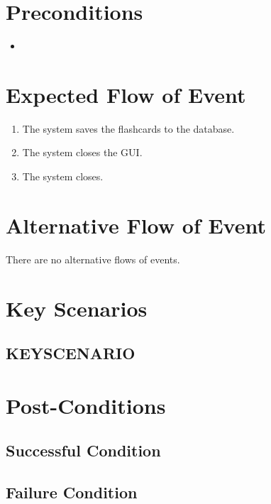 \documentclass{scrreprt}
\begin{document}
\section{Preconditions}
\begin{itemize}
    \item 
\end{itemize}

\section{Expected Flow of Event}
    \begin{enumerate}[1.]
        \item The system saves the flashcards to the database.
        \item The system closes the GUI.
        \item The system closes.
    \end{enumerate}

\section{Alternative Flow of Event}
    There are no alternative flows of events.

\section{Key Scenarios}
    \subsection{KEYSCENARIO}

\section{Post-Conditions}
    \subsection{Successful Condition}
    
    \subsection{Failure Condition}
\end{document}
